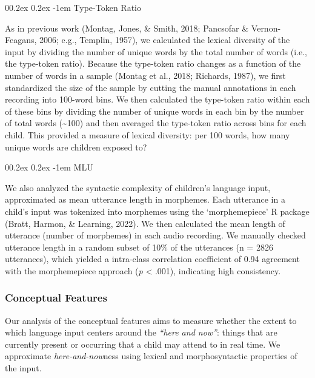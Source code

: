 \documentclass[
  man]{apa6}
\makeatletter
\let\oldparagraph\paragraph
\renewcommand{\paragraph}[1]{\oldparagraph{#1}\mbox{}}
\renewcommand{\paragraph}{\@startsection{paragraph}{4}{\parindent}%
  {0\baselineskip \@plus 0.2ex \@minus 0.2ex}%
  {-1em}%
  {\normalfont\normalsize\bfseries\itshape\typesectitle}}
\makeatother
\begin{document}
\hypertarget{type-token-ratio}{%
\paragraph{Type-Token Ratio}\label{type-token-ratio}}

As in previous work (Montag, Jones, \& Smith, 2018; Pancsofar \& Vernon-Feagans, 2006; e.g., Templin, 1957), we calculated the lexical diversity of the input by dividing the number of unique words by the total number of words (i.e., the type-token ratio). Because the type-token ratio changes as a function of the number of words in a sample (Montag et al., 2018; Richards, 1987), we first standardized the size of the sample by cutting the manual annotations in each recording into 100-word bins. We then calculated the type-token ratio within each of these bins by dividing the number of unique words in each bin by the number of total words (\textasciitilde100) and then averaged the type-token ratio across bins for each child. This provided a measure of lexical diversity: per 100 words, how many unique words are children exposed to?

\hypertarget{mlu}{%
\paragraph{MLU}\label{mlu}}

We also analyzed the syntactic complexity of children's language input, approximated as mean utterance length in morphemes. Each utterance in a child's input was tokenized into morphemes using the `morphemepiece' R package (Bratt, Harmon, \& Learning, 2022). We then calculated the mean length of utterance (number of morphemes) in each audio recording. We manually checked utterance length in a random subset of 10\% of the utterances (n = 2826 utterances), which yielded a intra-class correlation coefficient of 0.94 agreement with the morphemepiece approach (\emph{p} \textless{} .001), indicating high consistency.

\hypertarget{conceptual-features}{%
\subsubsection{Conceptual Features}\label{conceptual-features}}

Our analysis of the conceptual features aims to measure whether the extent to which language input centers around the \emph{``here and now''}: things that are currently present or occurring that a child may attend to in real time. We approximate \emph{here-and-now}ness using lexical and morphosyntactic properties of the input.
\end{document}
